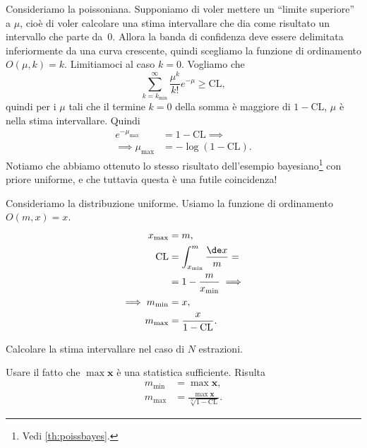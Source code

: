 \begin{example}
	\label{th:poisssup}
	Consideriamo la poissoniana.
	Supponiamo di voler mettere un ``limite superiore'' a $\mu$,
	cioè di voler calcolare una stima intervallare che dia come risultato un intervallo che parte da~0.
	Allora la banda di confidenza deve essere delimitata inferiormente da una curva crescente,
	quindi scegliamo la funzione di ordinamento $O(\mu,k)=k$.
	Limitiamoci al caso $k=0$.
	Vogliamo che
	\begin{equation*}
		\sum_{k=k_\mathrm{min}}^\infty \frac{\mu^k}{k!}e^{-\mu} \ge \mathrm{CL},
	\end{equation*}
	quindi per i $\mu$ tali che il termine $k=0$ della somma è maggiore di $1-\mathrm{CL}$,
	$\mu$ è nella stima intervallare.
	Quindi
	\begin{align*}
		e^{-\mu_\mathrm{max}}
		&= 1 - \mathrm{CL} \implies \\
		\implies \mu_\mathrm{\max}
		&= -\log(1-\mathrm{CL}).
	\end{align*}
	Notiamo che abbiamo ottenuto lo stesso risultato dell'esempio bayesiano\footnote{Vedi \autoref{th:poissbayes}.} con priore uniforme,
	e che tuttavia questa è una futile coincidenza!
\end{example}

\begin{example}
	Consideriamo la distribuzione uniforme.
	Usiamo la funzione di ordinamento $O(m,x)=x$.
	\begin{align*}
		x_\mathrm{max}
		&= m, \\
		\mathrm{CL}
		&= \int_{x_\mathrm{min}}^m \frac{\de x}{m} = \\
		&= 1 - \frac m{x_\mathrm{min}} \implies \\
		\implies m_\mathrm{min}
		&= x, \\
		m_\mathrm{max}
		&= \frac x{1-\mathrm{CL}}.
	\end{align*}
\end{example}

\begin{exercise}
	\label{th:unifsup}
	Calcolare la stima intervallare nel caso di $N$ estrazioni.
\end{exercise}

\begin{solution}
	Usare il fatto che $\max \mathbf x$ è una statistica sufficiente.
	Risulta
	\begin{align*}
		m_\mathrm{min}
		&= \max\mathbf x, \\
		m_\mathrm{max}
		&= \frac{\max\mathbf x}{\sqrt[N]{1-\mathrm{CL}}}.
	\end{align*}
\end{solution}

